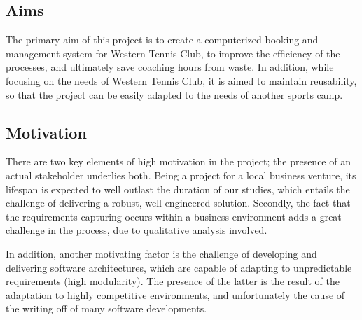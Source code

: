 \documentclass{l3proj}
\begin{document}
\subsection{Aims}
\par
The primary aim of this project is to create a computerized booking and management system for Western Tennis Club, to improve the efficiency of the processes, and ultimately save coaching hours from waste. In addition, while focusing on the needs of Western Tennis Club, it is aimed to maintain reusability, so that the project can be easily adapted to the needs of another sports camp.
 
\subsection{Motivation}
\par
There are two key elements of high motivation in the project; the presence of an actual stakeholder underlies both. Being a project for a local business venture, its lifespan is expected to well outlast the duration of our studies, which entails the challenge of delivering a robust, well-engineered solution. Secondly, the fact that the requirements capturing occurs within a business environment adds a great challenge in the process, due to qualitative analysis involved.

\par In addition, another motivating factor is the challenge of developing and delivering software architectures, which are capable of adapting to unpredictable requirements (high modularity). The presence of the latter is the result of the adaptation to highly competitive environments, and unfortunately the cause of the writing off of many software developments. 


\end{document}

